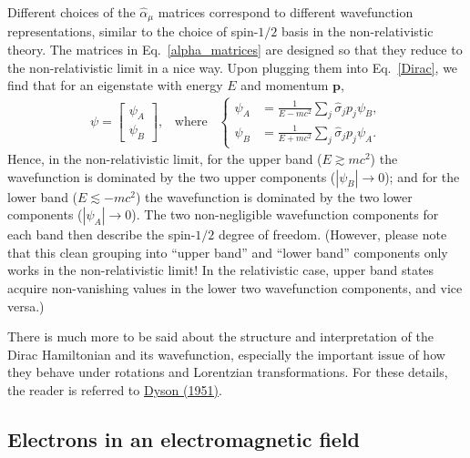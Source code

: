 \documentclass[pra,12pt]{revtex4}
\begin{document}
Different choices of the $\hat{\alpha}_\mu$ matrices correspond to
different wavefunction representations, similar to the choice of
spin-$1/2$ basis in the non-relativistic theory.  The matrices in
Eq.~\eqref{alpha_matrices} are designed so that they reduce to the
non-relativistic limit in a nice way.  Upon plugging them into
Eq.~\eqref{Dirac}, we find that for an eigenstate with energy $E$ and
momentum $\mathbf{p}$,
\begin{align}
  \psi = \begin{bmatrix}\psi_A \\ \psi_B
  \end{bmatrix}, \;\;\;\mathrm{where}\;\;\; \left\{
  \begin{aligned}
    \psi_A &= \frac{1}{E - mc^2} \sum_j \hat{\sigma}_j p_j \psi_B, \\
    \psi_B &= \frac{1}{E + mc^2} \sum_j \hat{\sigma}_j p_j \psi_A.
  \end{aligned}\right.
  \label{dirac_nonrelativistic}
\end{align}
Hence, in the non-relativistic limit, for the upper band ($E \gtrsim
mc^2$) the wavefunction is dominated by the two upper components
($|\psi_B| \rightarrow 0$); and for the lower band ($E \lesssim
-mc^2$) the wavefunction is dominated by the two lower components
($|\psi_A| \rightarrow 0$).  The two non-negligible wavefunction
components for each band then describe the spin-$1/2$ degree of
freedom.  (However, please note that this clean grouping into ``upper
band'' and ``lower band'' components only works in the
non-relativistic limit!  In the relativistic case, upper band states
acquire non-vanishing values in the lower two wavefunction components,
and vice versa.)

There is much more to be said about the structure and interpretation
of the Dirac Hamiltonian and its wavefunction, especially the
important issue of how they behave under rotations and Lorentzian
transformations.  For these details, the reader is referred to
\hyperref[cite:dyson]{Dyson (1951)}.

\subsection{Electrons in an electromagnetic field}
\label{sec:diracem}
\end{document}
